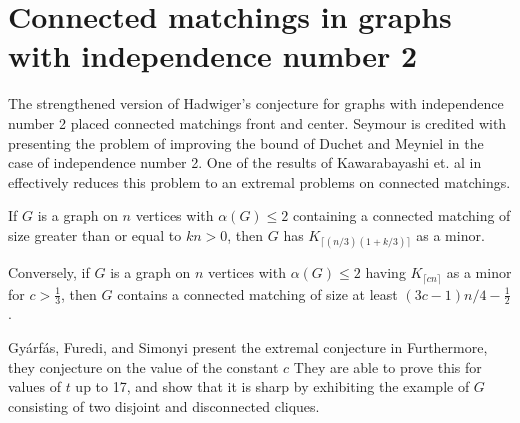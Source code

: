 \section{Connected matchings in graphs with independence number 2}

The strengthened version of Hadwiger's conjecture for graphs with independence number 2 placed connected matchings front and center.  Seymour is credited with presenting the problem of improving the bound of Duchet and Meyniel in the case of independence number 2.
One of the results of Kawarabayashi et. al in \cite{Kawara} effectively reduces this problem to an extremal problems on connected matchings.
\begin{theorem} If $G$ is a graph on $n$ vertices with $\alpha(G) \leq 2$ containing a connected matching of size greater than or equal to $kn>0$, then $G$ has $K_{\lceil (n/3)(1+k/3)\rceil}$ as a minor.

Conversely, if $G$ is a graph on $n$ vertices with $\alpha(G) \leq 2$ having $K_{\lceil cn\rceil}$ as a minor for $c> \frac{1}{3}$, then $G$ contains a connected matching of size at least $(3c-1)n/4 -\frac{1}{2}$.\label{ramsey_flavor}
\end{theorem}

Gy\'arf\'as, F\:uredi, and Simonyi present the extremal conjecture in \cite{GFS}
Furthermore, they conjecture on the value of the constant $c$
They are able to prove this for values of $t$ up to 17, and show that it is sharp by exhibiting the example of $G$ consisting of two disjoint and disconnected cliques.

